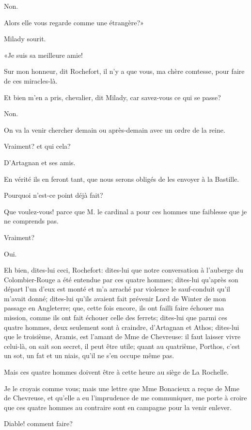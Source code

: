 \speak  Non. 

\speak  Alors elle vous regarde comme une étrangère?» 

Milady sourit. 

«Je suis sa meilleure amie! 

\speak  Sur mon honneur, dit Rochefort, il n'y a que vous, ma chère comtesse, pour faire de ces miracles-là. 

\speak  Et bien m'en a pris, chevalier, dit Milady, car savez-vous ce qui se passe? 

\speak  Non. 

\speak  On va la venir chercher demain ou après-demain avec un ordre de la reine. 

\speak  Vraiment? et qui cela? 

\speak  D'Artagnan et ses amis. 

\speak  En vérité ils en feront tant, que nous serons obligés de les envoyer à la Bastille. 

\speak  Pourquoi n'est-ce point déjà fait? 

\speak  Que voulez-vous! parce que M. le cardinal a pour ces hommes une faiblesse que je ne comprends pas. 

\speak  Vraiment? 

\speak  Oui. 

\speak  Eh bien, dites-lui ceci, Rochefort: dites-lui que notre conversation à l'auberge du Colombier-Rouge a été entendue par ces quatre hommes; dites-lui qu'après son départ l'un d'eux est monté et m'a arraché par violence le sauf-conduit qu'il m'avait donné; dites-lui qu'ils avaient fait prévenir Lord de Winter de mon passage en Angleterre; que, cette fois encore, ils ont failli faire échouer ma mission, comme ils ont fait échouer celle des ferrets; dites-lui que parmi ces quatre hommes, deux seulement sont à craindre, d'Artagnan et Athos; dites-lui que le troisième, Aramis, est l'amant de Mme de Chevreuse: il faut laisser vivre celui-là, on sait son secret, il peut être utile; quant au quatrième, Porthos, c'est un sot, un fat et un niais, qu'il ne s'en occupe même pas. 

\speak  Mais ces quatre hommes doivent être à cette heure au siège de La Rochelle. 

\speak  Je le croyais comme vous; mais une lettre que Mme Bonacieux a reçue de Mme de Chevreuse, et qu'elle a eu l'imprudence de me communiquer, me porte à croire que ces quatre hommes au contraire sont en campagne pour la venir enlever. 

\speak  Diable! comment faire? 

